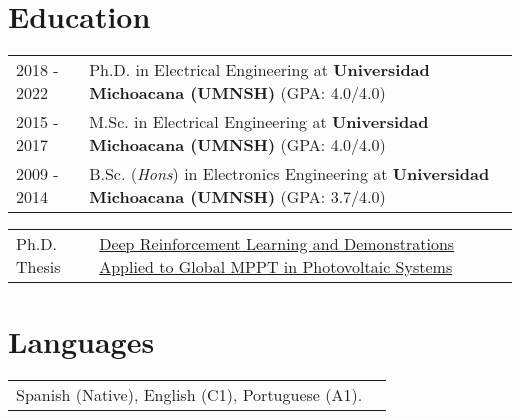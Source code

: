 \documentclass[a4paper,10pt]{article}
\begin{document}
\section{Education}
\begin{tabularx}{\linewidth}{@{}l X@{}}	
2018 - 2022 & Ph.D. in Electrical Engineering  at \textbf{Universidad Michoacana (UMNSH)} \hfill \normalsize (GPA: 4.0/4.0) \\

2015 - 2017 & M.Sc. in Electrical Engineering at \textbf{Universidad Michoacana (UMNSH)} \hfill (GPA: 4.0/4.0) \\ 

2009 - 2014 & B.Sc. (\textit{Hons}) in Electronics Engineering at \textbf{Universidad Michoacana (UMNSH)} \hfill (GPA: 3.7/4.0) \\ 
\end{tabularx}

\begin{tiny}
    \hspace{6cm}\hrulefill\hspace{6cm}
\end{tiny}


\begin{tabularx}{\linewidth}{@{}l X@{}}		
Ph.D. Thesis & \href{https://balcortex.github.io/assets/thesis/thesis_phd.pdf}{Deep Reinforcement Learning and Demonstrations Applied to Global MPPT in Photovoltaic Systems} \hfill \\
\end{tabularx}


\section{Languages}
\begin{tabularx}{\linewidth}{@{}l X@{}}
Spanish (Native), English (C1), Portuguese (A1).\\  
\end{tabularx}
\end{document}
